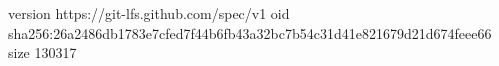 version https://git-lfs.github.com/spec/v1
oid sha256:26a2486db1783e7cfed7f44b6fb43a32bc7b54c31d41e821679d21d674feee66
size 130317
